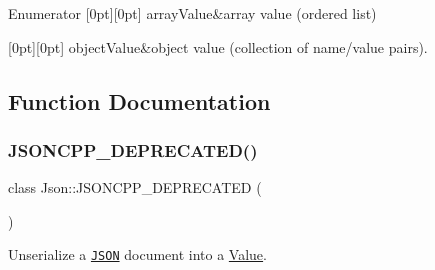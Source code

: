 \begin{DoxyEnumFields}{Enumerator}
[0pt][0pt]{}\mbox{\label{namespaceJson_a7d654b75c16a57007925868e38212b4eadc8f264f36b55b063c78126b335415f4}} 
array\+Value&array value (ordered list) \\
\hline

[0pt][0pt]{}\mbox{\label{namespaceJson_a7d654b75c16a57007925868e38212b4eae8386dcfc36d1ae897745f7b4f77a1f6}} 
object\+Value&object value (collection of name/value pairs). \\
\hline

\end{DoxyEnumFields}


\subsection{Function Documentation}
\mbox{\label{namespaceJson_a61b556ffe4c70c4492a9dbe4718ec50b}} 
\subsubsection{\texorpdfstring{J\+S\+O\+N\+C\+P\+P\+\_\+\+D\+E\+P\+R\+E\+C\+A\+T\+E\+D()}{JSONCPP\_DEPRECATED()}\hspace{0.1cm}{\footnotesize\ttfamily [1/3]}}
{\footnotesize\ttfamily class Json\+::\+J\+S\+O\+N\+C\+P\+P\+\_\+\+D\+E\+P\+R\+E\+C\+A\+T\+ED (\begin{DoxyParamCaption}\item[{\char`\"{}Use \hyperlink{classJson_1_1CharReader}{Char\+Reader} and \hyperlink{classJson_1_1CharReaderBuilder}{Char\+Reader\+Builder} instead\char`\"{}}]{ }\end{DoxyParamCaption})}



Unserialize a \href{http://www.json.org}{\tt J\+S\+ON} document into a \hyperlink{classJson_1_1Value}{Value}. 

